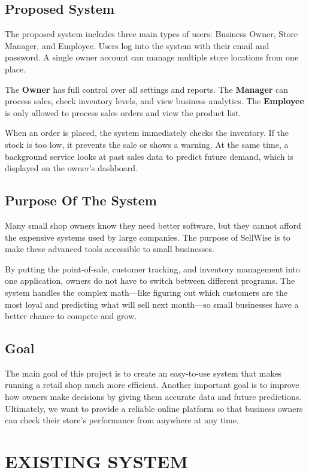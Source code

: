 \documentclass[12pt,a4paper]{report}
\begin{document}
\section{Proposed System}
The proposed system includes three main types of users: Business Owner, Store Manager, and Employee. Users log into the system with their email and password. A single owner account can manage multiple store locations from one place.

The \textbf{Owner} has full control over all settings and reports. The \textbf{Manager} can process sales, check inventory levels, and view business analytics. The \textbf{Employee} is only allowed to process sales orders and view the product list.

When an order is placed, the system immediately checks the inventory. If the stock is too low, it prevents the sale or shows a warning. At the same time, a background service looks at past sales data to predict future demand, which is displayed on the owner's dashboard.

\section{Purpose Of The System}
Many small shop owners know they need better software, but they cannot afford the expensive systems used by large companies. The purpose of SellWise is to make these advanced tools accessible to small businesses.

By putting the point-of-sale, customer tracking, and inventory management into one application, owners do not have to switch between different programs. The system handles the complex math—like figuring out which customers are the most loyal and predicting what will sell next month—so small businesses have a better chance to compete and grow.

\section{Goal}
The main goal of this project is to create an easy-to-use system that makes running a retail shop much more efficient. Another important goal is to improve how owners make decisions by giving them accurate data and future predictions. Ultimately, we want to provide a reliable online platform so that business owners can check their store's performance from anywhere at any time.

\chapter{EXISTING SYSTEM}
\end{document}
